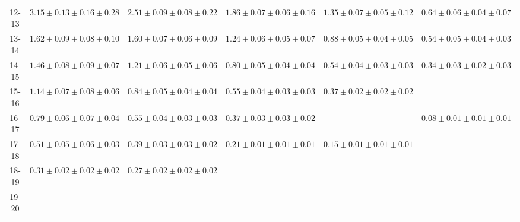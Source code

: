 \begin{sidewaystable}[h]
{\begin{tabular}{c|ccccc}
12-13 & $3.15\pm0.13\pm0.16\pm0.28$ & $2.51\pm0.09\pm0.08\pm0.22$ & $1.86\pm0.07\pm0.06\pm0.16$ & $1.35\pm0.07\pm0.05\pm0.12$ & $0.64\pm0.06\pm0.04\pm0.07$\\
13-14 & $1.62\pm0.09\pm0.08\pm0.10$ & $1.60\pm0.07\pm0.06\pm0.09$ & $1.24\pm0.06\pm0.05\pm0.07$ & $0.88\pm0.05\pm0.04\pm0.05$ & $0.54\pm0.05\pm0.04\pm0.03$\\  \cline{6-6}
14-15 &   $1.46\pm0.08\pm0.09\pm0.07$ &   $1.21\pm0.06\pm0.05\pm0.06$ &   $0.80\pm0.05\pm0.04\pm0.04$ &   $0.54\pm0.04\pm0.03\pm0.03$ &  \multirow{2}{*}{ $0.34\pm0.03\pm0.02\pm0.03$}   \\  \cline{5-5}
15-16 &   $1.14\pm0.07\pm0.08\pm0.06$ &   $0.84\pm0.05\pm0.04\pm0.04$ &   $0.55\pm0.04\pm0.03\pm0.03$ & \multirow{2}{*}{ $0.37\pm0.02\pm0.02\pm0.02$} &   \\  \cline{6-6}
16-17 &    $0.79\pm0.06\pm0.07\pm0.04$ &    $0.55\pm0.04\pm0.03\pm0.03$ &    $0.37\pm0.03\pm0.03\pm0.02$ &     & \multirow{4}{*}{ $0.08\pm0.01\pm0.01\pm0.01$} \\ \cline{4-5}
17-18 &    $0.51\pm0.05\pm0.06\pm0.03$ &    $0.39\pm0.03\pm0.03\pm0.02$ & \multirow{3}{*}{ $0.21\pm0.01\pm0.01\pm0.01$} & \multirow{3}{*}{ $0.15\pm0.01\pm0.01\pm0.01$} &   \\  \cline{2-3}
18-19 & \multirow{2}{*}{ $0.31\pm0.02\pm0.02\pm0.02$} & \multirow{2}{*}{ $0.27\pm0.02\pm0.02\pm0.02$} &    &    &   \\
19-20 &    &    &    &    &   \\ \cline{2-4}
 \hline
\end{tabular}
}
\label{tab:results_prompt}
\end{sidewaystable}

